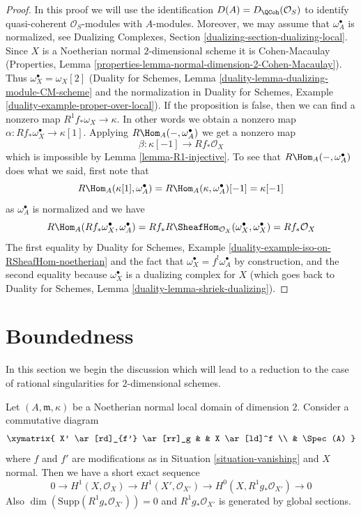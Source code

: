 \begin{proof}
In this proof we will use the identification $D(A) = D_\QCoh(\mathcal{O}_S)$
to identify quasi-coherent $\mathcal{O}_S$-modules with $A$-modules.
Moreover, we may assume that $\omega_A^\bullet$ is normalized, see
Dualizing Complexes, Section \ref{dualizing-section-dualizing-local}.
Since $X$ is a Noetherian normal $2$-dimensional scheme
it is Cohen-Macaulay (Properties, Lemma
\ref{properties-lemma-normal-dimension-2-Cohen-Macaulay}).
Thus $\omega_X^\bullet = \omega_X[2]$ (Duality for Schemes, Lemma
\ref{duality-lemma-dualizing-module-CM-scheme} and the
normalization in Duality for Schemes, Example
\ref{duality-example-proper-over-local}).
If the proposition is false, then we can find a nonzero map
$R^1f_*\omega_X \to \kappa$. In other words we obtain a nonzero map
$\alpha : Rf_*\omega_X^\bullet \to \kappa[1]$.
Applying $R\Hom_A(-, \omega_A^\bullet)$ we get a nonzero map
$$
\beta : \kappa[-1] \longrightarrow Rf_*\mathcal{O}_X
$$
which is impossible by Lemma \ref{lemma-R1-injective}.
To see that $R\Hom_A(-, \omega_A^\bullet)$ does what we said, first
note that
$$
R\Hom_A(\kappa[1], \omega_A^\bullet) =
R\Hom_A(\kappa, \omega_A^\bullet)[-1] =
\kappa[-1]
$$
as $\omega_A^\bullet$ is normalized and we have
$$
R\Hom_A(Rf_*\omega_X^\bullet, \omega_A^\bullet) =
Rf_*R\SheafHom_{\mathcal{O}_X}(\omega_X^\bullet, \omega_X^\bullet) =
Rf_*\mathcal{O}_X
$$
The first equality by
Duality for Schemes, Example \ref{duality-example-iso-on-RSheafHom-noetherian}
and the fact that $\omega_X^\bullet = f^!\omega_A^\bullet$
by construction, and the second equality because $\omega_X^\bullet$
is a dualizing complex for $X$ (which goes back to
Duality for Schemes, Lemma \ref{duality-lemma-shriek-dualizing}).
\end{proof}





\section{Boundedness}
\label{section-bounded}

\noindent
In this section we begin the discussion which will lead to a reduction to
the case of rational singularities for $2$-dimensional schemes.

\begin{lemma}
\label{lemma-exact-sequence}
Let $(A, \mathfrak m, \kappa)$ be a Noetherian normal local domain
of dimension $2$. Consider a commutative diagram
$$
\xymatrix{
X' \ar[rd]_{f'} \ar[rr]_g & & X \ar[ld]^f \\
& \Spec(A)
}
$$
where $f$ and $f'$ are modifications as in Situation \ref{situation-vanishing}
and $X$ normal. Then we have a short exact sequence
$$
0 \to H^1(X, \mathcal{O}_X) \to H^1(X', \mathcal{O}_{X'}) \to
H^0(X, R^1g_*\mathcal{O}_{X'}) \to 0
$$
Also $\dim(\text{Supp}(R^1g_*\mathcal{O}_{X'})) = 0$
and $R^1g_*\mathcal{O}_{X'}$ is generated by global sections.
\end{lemma}

